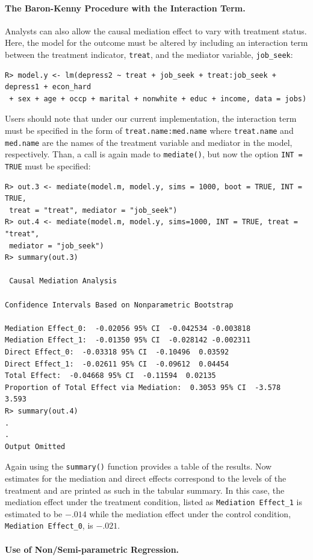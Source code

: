 \documentclass[11pt,letterpaper]{article}
\theoremstyle{plain}
\begin{document}
\paragraph{The Baron-Kenny Procedure with the Interaction Term.}
Analysts can also allow the causal mediation effect to vary with
treatment status.  Here, the model for the outcome must be altered by
including an interaction term between the treatment indicator,
\texttt{treat}, and the mediator variable, \texttt{job\_seek}:
\begin{verbatim}
R> model.y <- lm(depress2 ~ treat + job_seek + treat:job_seek + depress1 + econ_hard
 + sex + age + occp + marital + nonwhite + educ + income, data = jobs)
\end{verbatim}
Users should note that under our current implementation, the interaction 
term must be specified in the form of {\tt treat.name:med.name} where
{\tt treat.name} and {\tt med.name} are the names of the treatment variable
and mediator in the model, respectively.  Than, a call is again made 
to \texttt{mediate()}, but now the option \texttt{INT = TRUE} must be specified:
\begin{verbatim}
R> out.3 <- mediate(model.m, model.y, sims = 1000, boot = TRUE, INT = TRUE,
 treat = "treat", mediator = "job_seek")
R> out.4 <- mediate(model.m, model.y, sims=1000, INT = TRUE, treat = "treat", 
 mediator = "job_seek")
R> summary(out.3)

 Causal Mediation Analysis 

Confidence Intervals Based on Nonparametric Bootstrap

Mediation Effect_0:  -0.02056 95% CI  -0.042534 -0.003818 
Mediation Effect_1:  -0.01350 95% CI  -0.028142 -0.002311 
Direct Effect_0:  -0.03318 95% CI  -0.10496  0.03592 
Direct Effect_1:  -0.02611 95% CI  -0.09612  0.04454 
Total Effect:  -0.04668 95% CI  -0.11594  0.02135 
Proportion of Total Effect via Mediation:  0.3053 95% CI  -3.578  3.593 
R> summary(out.4)
.
.
Output Omitted
\end{verbatim}
Again using the \texttt{summary()} function provides a table of the
results. Now estimates for the mediation and direct effects correspond
to the levels of the treatment and are printed as such in the tabular
summary.  In this case, the mediation effect under the treatment
condition, listed as \texttt{Mediation Effect\_1} is estimated to be
$-.014$ while the mediation effect under the control condition,
\texttt{Mediation Effect\_0}, is $-.021$.

\paragraph{Use of Non/Semi-parametric Regression.}
\end{document}
